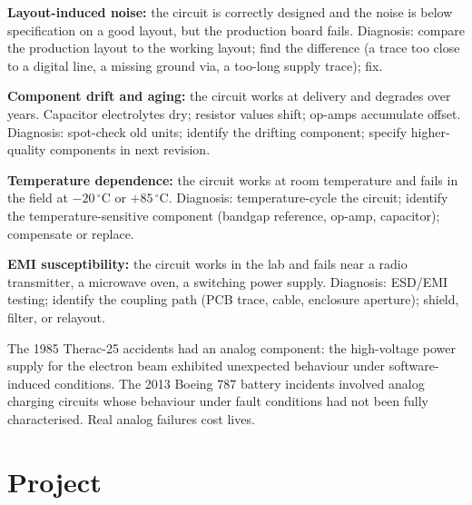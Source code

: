 \textbf{Layout-induced noise:} the circuit is correctly designed and the noise is below specification on a good layout, but the production board fails. Diagnosis: compare the production layout to the working layout; find the difference (a trace too close to a digital line, a missing ground via, a too-long supply trace); fix.

\textbf{Component drift and aging:} the circuit works at delivery and degrades over years. Capacitor electrolytes dry; resistor values shift; op-amps accumulate offset. Diagnosis: spot-check old units; identify the drifting component; specify higher-quality components in next revision.

\textbf{Temperature dependence:} the circuit works at room temperature and fails in the field at $-20\,^\circ\text{C}$ or $+85\,^\circ\text{C}$. Diagnosis: temperature-cycle the circuit; identify the temperature-sensitive component (bandgap reference, op-amp, capacitor); compensate or replace.

\textbf{EMI susceptibility:} the circuit works in the lab and fails near a radio transmitter, a microwave oven, a switching power supply. Diagnosis: ESD/EMI testing; identify the coupling path (PCB trace, cable, enclosure aperture); shield, filter, or relayout.

The 1985 Therac-25 accidents had an analog component: the high-voltage power supply for the electron beam exhibited unexpected behaviour under software-induced conditions. The 2013 Boeing 787 battery incidents involved analog charging circuits whose behaviour under fault conditions had not been fully characterised. Real analog failures cost lives.

\section{Project}

